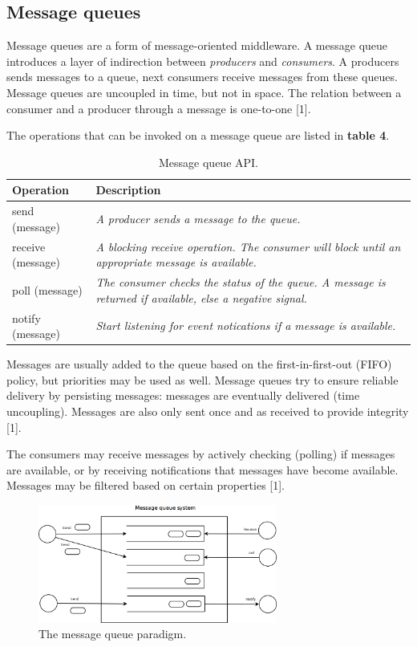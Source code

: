 \subsection{Message queues}

Message queues are a form of message-oriented middleware. A message queue introduces a layer of indirection between \emph{producers} and \emph{consumers}. A producers sends messages to a queue, next consumers receive messages from these queues. Message queues are uncoupled in time, but not in space. The relation between a consumer and a producer through a message is one-to-one [1].

The operations that can be invoked on a message queue are listed in \textbf{table 4}.


\begin{table}
	\caption{Message queue API.}
	\label{tab:api:messagequeues}
	\begin{tabular}{p{150px} | p{250px}}
		\textbf{Operation} & \textbf{Description} \\
		\hline
		send (message) & \emph{A producer sends a message to the queue.} \\
		receive (message) & \emph{A blocking receive operation. The consumer will block until an appropriate message is available.} \\
		poll (message) & \emph{The consumer checks the status of the queue. A message is returned if available, else a negative signal.} \\
		notify (message) & \emph{Start listening for event notications if a message is available.} \\
		\hline
	\end{tabular}
\end{table}


Messages are usually added to the queue based on the first-in-first-out (FIFO) policy, but priorities may be used as well. Message queues try to ensure reliable delivery by persisting messages: messages are eventually delivered (time uncoupling). Messages are also only sent once and as received to provide integrity [1].

The consumers may receive messages by actively checking (polling) if messages are available, or by receiving notifications that messages have become available. Messages may be filtered based on certain properties [1].

\begin{figure}
	\begin{center}
		\includegraphics[width=0.7\textwidth]{img/messagequeues}
	\end{center}
	\caption{The message queue paradigm.}
	\label{fig:messagequeues}
\end{figure}



